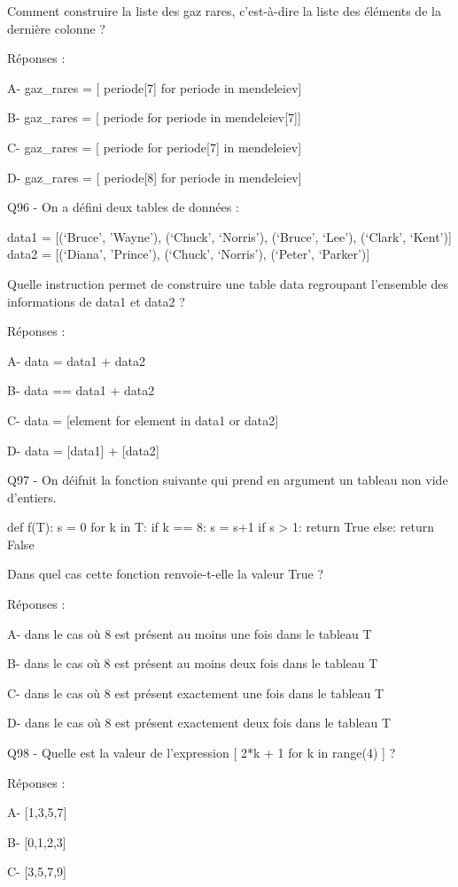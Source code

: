 \documentclass[
]{book}
\begin{document}
Comment construire la liste des gaz rares, c'est-à-dire la liste des éléments de la dernière colonne ?

Réponses :

A- gaz\_rares = {[} periode{[}7{]} for periode in mendeleiev{]}

B- gaz\_rares = {[} periode for periode in mendeleiev{[}7{]}{]}

C- gaz\_rares = {[} periode for periode{[}7{]} in mendeleiev{]}

D- gaz\_rares = {[} periode{[}8{]} for periode in mendeleiev{]}

Q96 - On a défini deux tables de données :

data1 = {[}(`Bruce', 'Wayne'), (`Chuck', `Norris'), (`Bruce', `Lee'), (`Clark', `Kent'){]}
data2 = {[}(`Diana', 'Prince'), (`Chuck', `Norris'), (`Peter', `Parker'){]}

Quelle instruction permet de construire une table data regroupant l'ensemble des informations de data1 et data2 ?

Réponses :

A- data = data1 + data2

B- data == data1 + data2

C- data = {[}element for element in data1 or data2{]}

D- data = {[}data1{]} + {[}data2{]}

Q97 - On déifnit la fonction suivante qui prend en argument un tableau non vide d'entiers.

def f(T):
s = 0
for k in T:
if k == 8:
s = s+1
if s \textgreater{} 1:
return True
else:
return False

Dans quel cas cette fonction renvoie-t-elle la valeur True ?

Réponses :

A- dans le cas où 8 est présent au moins une fois dans le tableau T

B- dans le cas où 8 est présent au moins deux fois dans le tableau T

C- dans le cas où 8 est présent exactement une fois dans le tableau T

D- dans le cas où 8 est présent exactement deux fois dans le tableau T

Q98 - Quelle est la valeur de l'expression {[} 2*k + 1 for k in range(4) {]} ?

Réponses :

A- {[}1,3,5,7{]}

B- {[}0,1,2,3{]}

C- {[}3,5,7,9{]}
\end{document}
